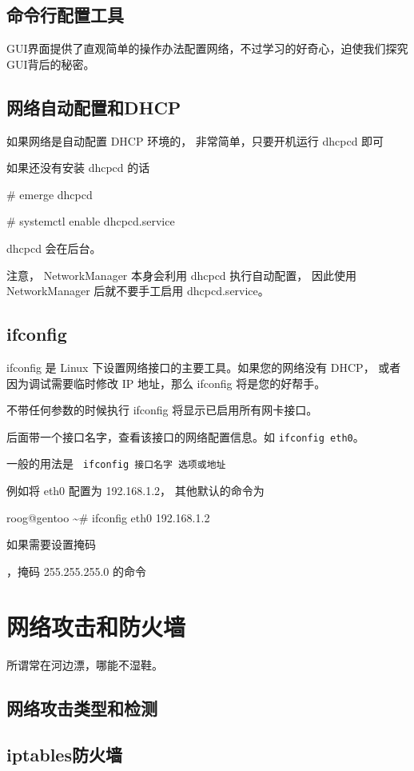 
\subsection{命令行配置工具}

GUI界面提供了直观简单的操作办法配置网络，不过学习的好奇心，迫使我们探究GUI背后的秘密。

\subsection{网络自动配置和DHCP}\label{sec:DHCP}

如果网络是自动配置 DHCP 环境的， 非常简单，只要开机运行 dhcpcd 即可

\begin{code}
如果还没有安装 dhcpcd 的话

\# emerge dhcpcd
\end{code}

\begin{code}
\# systemctl enable dhcpcd.service
\end{code}

dhcpcd 会在后台。

\begin{notice}
注意， NetworkManager 本身会利用 dhcpcd 执行自动配置， 因此使用 NetworkManager 后就不要手工启用 dhcpcd.service。
\end{notice}

\subsection{ifconfig}


ifconfig 是 Linux 下设置网络接口的主要工具。如果您的网络没有 DHCP， 或者因为调试需要临时修改 IP 地址，那么  ifconfig 将是您的好帮手。

不带任何参数的时候执行 ifconfig 将显示已启用所有网卡接口。

后面带一个接口名字，查看该接口的网络配置信息。如  \texttt{ifconfig eth0}。

一般的用法是 \texttt{ ifconfig 接口名字  选项或地址}

例如将 eth0 配置为 192.168.1.2， 其他默认的命令为 


\begin{code}
roog@gentoo \textasciitilde  \# ifconfig eth0  192.168.1.2
\end{code}

如果需要设置掩码

 ，掩码 255.255.255.0 的命令


\section{网络攻击和防火墙}

所谓常在河边漂，哪能不湿鞋。


\subsection{网络攻击类型和检测}

\subsection{iptables防火墙}

